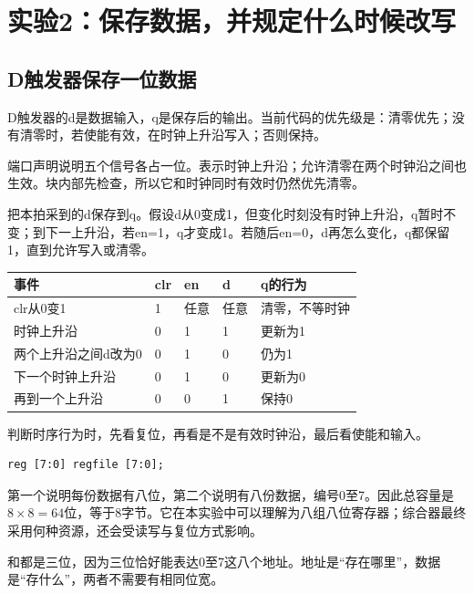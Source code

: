 \clearpage\section{实验2：保存数据，并规定什么时候改写}
\subsection{D触发器保存一位数据}
D触发器的d是数据输入，q是保存后的输出。当前代码的优先级是：清零优先；没有清零时，若使能有效，在时钟上升沿写入；否则保持。


端口声明说明五个信号各占一位。表示时钟上升沿；允许清零在两个时钟沿之间也生效。块内部先检查，所以它和时钟同时有效时仍然优先清零。

把本拍采到的d保存到q。假设d从0变成1，但变化时刻没有时钟上升沿，q暂时不变；到下一上升沿，若en=1，q才变成1。若随后en=0，d再怎么变化，q都保留1，直到允许写入或清零。

\begin{center}
\begin{tabularx}{\linewidth}{@{}llllX@{}}\toprule
事件 & clr & en & d & q的行为\\\midrule
clr从0变1 & 1 & 任意 & 任意 & 清零，不等时钟\\
时钟上升沿 & 0 & 1 & 1 & 更新为1\\
两个上升沿之间d改为0 & 0 & 1 & 0 & 仍为1\\
下一个时钟上升沿 & 0 & 1 & 0 & 更新为0\\
再到一个上升沿 & 0 & 0 & 1 & 保持0\\\bottomrule
\end{tabularx}
\end{center}

判断时序行为时，先看复位，再看是不是有效时钟沿，最后看使能和输入。

\begin{lstlisting}
reg [7:0] regfile [7:0];
\end{lstlisting}
第一个\code{[7:0]}说明每份数据有八位，第二个\code{[7:0]}说明有八份数据，编号0至7。因此总容量是$8\times8=64$位，等于8字节。它在本实验中可以理解为八组八位寄存器；综合器最终采用何种资源，还会受读写与复位方式影响。

和都是三位，因为三位恰好能表达0至7这八个地址。地址是“存在哪里”，数据是“存什么”，两者不需要有相同位宽。

\begin{center}
\end{center}

